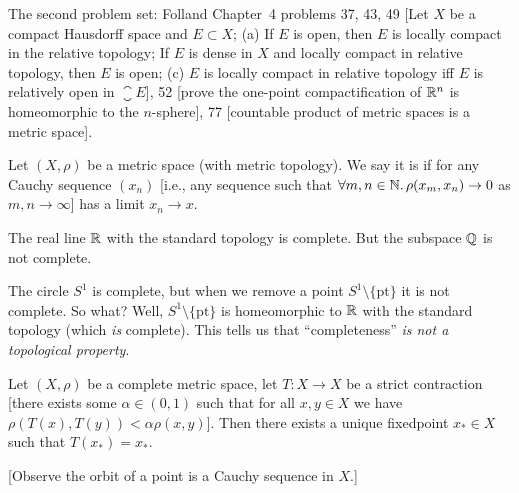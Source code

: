 

\begin{node}
The second problem set: Folland Chapter~4 problems 37, 43, 49 [Let $X$
  be a compact Hausdorff space and $E\subset X$; (a) If $E$ is open,
  then $E$ is locally compact in the relative topology; If $E$ is
  dense in $X$ and locally compact in relative topology, then $E$ is
  open; (c) $E$ is locally compact in relative topology iff $E$ is
  relatively open in $\closure{E}$], 52
[prove the one-point compactification of $\mathbb{R}^{n}$ is homeomorphic to
  the $n$-sphere], 77 [countable product of metric spaces is a metric space].
\end{node}

\begin{definition}
Let $(X,\rho)$ be a metric space (with metric topology). We say it is
 if for any Cauchy sequence $(x_{n})$ [i.e., any
  sequence such that $\forall m,n\in\mathbb{N}\ldotp\rho(x_{m},x_{n})\to0$ as $m,n\to\infty$]
has a limit $x_{n}\to x$.
\end{definition}

\begin{example}
The real line $\mathbb{R}$ with the standard topology is complete. But the
subspace $\mathbb{Q}$ is not complete.
\end{example}

\begin{example}
The circle $S^{1}$ is complete, but when we remove a point
$S^{1}\setminus\{\mbox{pt}\}$ it is not complete. So what? Well,
$S^{1}\setminus\{\mbox{pt}\}$ is homeomorphic to $\mathbb{R}$ with the
standard topology (which \emph{is} complete). This tells us that
``completeness'' \emph{is not a topological property}.
\end{example}

\begin{theorem}
Let $(X,\rho)$ be a complete metric space, let $T\colon X\to X$ be a
strict contraction [there exists some $\alpha\in(0,1)$ such that for
  all $x,y\in X$ we have $\rho(T(x),T(y))<\alpha\rho(x,y)$].
Then there exists a unique fixedpoint $x_{*}\in X$ such that $T(x_{*})=x_{*}$.
\end{theorem}

[Observe the orbit of a point is a Cauchy sequence in $X$.]

